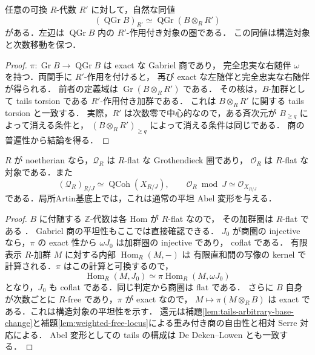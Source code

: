 \begin{lemma}
\label{lem:tails-arbitrary-base-change}
任意の可換 $R$-代数 $R'$ に対して，自然な同値
\[
 (\operatorname{QGr}B)_{R'}
 \simeq\operatorname{QGr}(B\otimes_RR')
\]
がある．左辺は $\operatorname{QGr}B$ 内の $R'$-作用付き対象の圏である．
この同値は構造対象と次数移動を保つ．
\end{lemma}
\begin{proof}
$\pi:\operatorname{Gr}B\to\operatorname{QGr}B$ は exact な Gabriel 商であり，
完全忠実な右随伴 $\omega$ を持つ．両関手に $R'$-作用を付けると，
再び exact な左随伴と完全忠実な右随伴が得られる．
前者の定義域は $\operatorname{Gr}(B\otimes_RR')$ である．
その核は，$B$-加群として tails torsion である $R'$-作用付き加群である．
これは $B\otimes_RR'$ に関する tails torsion と一致する．
実際，$R'$ は次数零で中心的なので，ある斉次元が $B_{\ge q}$ によって消える条件と，
$(B\otimes_RR')_{\ge q}$ によって消える条件は同じである．
商の普遍性から結論を得る．
\end{proof}

\begin{lemma}
\label{lem:tails-flat-deformation}
$R$ が noetherian なら，$\mathcal Q_R$ は $R$-flat な Grothendieck 圏であり，
$\mathcal O_R$ は $R$-flat な対象である．また
\[
 (\mathcal Q_R)_{R/J}\simeq\operatorname{QCoh}(X_{R/J}),
 \qquad \mathcal O_R\bmod J\simeq\mathcal O_{X_{R/J}}
\]
である．局所Artin基底上では，これは通常の平坦 Abel 変形を与える．
\end{lemma}
\begin{proof}
$B$ に付随する $\mathbb Z$-代数は各 Hom が $R$-flat なので，
その加群圏は $R$-flat である
\cite[arXiv v1, Proposition~3.7]{LowenVdBDeformation}．
Gabriel 商の平坦性もここでは直接確認できる．
$J_0$ が商圏の injective なら，$\pi$ の exact 性から $\omega J_0$ は加群圏の injective であり，
coflat である\cite[arXiv v1, Proposition~3.4]{LowenVdBDeformation}．
有限表示 $R$-加群 $M$ に対する内部 $\operatorname{Hom}_R(M,-)$ は
有限直和間の写像の kernel で計算される．$\pi$ はこの計算と可換するので，
\[
 \operatorname{Hom}_R(M,J_0)
 \simeq\pi\operatorname{Hom}_R(M,\omega J_0)
\]
となり，$J_0$ も coflat である．同じ判定から商圏は flat である．
さらに $B$ 自身が次数ごとに $R$-free であり，$\pi$ が exact なので，
$M\mapsto\pi(M\otimes_RB)$ は exact である．これは構造対象の平坦性を示す．
還元は補題\ref{lem:tails-arbitrary-base-change}と補題\ref{lem:weighted-free-locus}による重み付き商の自由性と相対 Serre 対応による．
Abel 変形としての tails の構成は
De Deken--Lowen \cite[Proposition~4.4]{DDL2011} とも一致する．
\end{proof}

